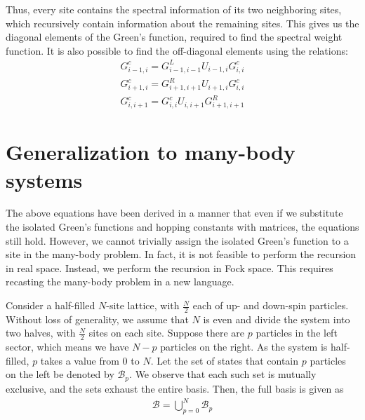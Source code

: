 	Thus, every site contains the spectral information of its two neighboring sites, which recursively contain information about the remaining sites. This gives us the diagonal elements of the Green's function, required to find the spectral weight function. It is also possible to find the off-diagonal elements using the relations:
	\begin{align}\label{eqn:connecting-eqn-onebody}
		G^{c}_{i-1,i} = G^{L}_{i-1,i-1} U_{i-1,i} G^{c}_{i,i}\\
		G^{c}_{i+1,i} = G^{R}_{i+1,i+1} U_{i+1,i} G^{c}_{i,i}\\
		G^{c}_{i,i+1} = G^{c}_{i,i} U_{i,i+1} G^{R}_{i+1,i+1}
	\end{align}

\section{Generalization to many-body systems}\label{sec:generalized-manybody}
	The above equations have been derived in a manner that even if we substitute the isolated Green's functions and hopping constants with matrices, the equations still hold.
	However, we cannot trivially assign the isolated Green's function to a site in the many-body problem. In fact, it is not feasible to perform the recursion in real space. Instead, we perform the recursion in Fock space. This requires recasting the many-body problem in a new language.
	
	Consider a half-filled $ N $-site lattice, with $ \tfrac{N}{2} $ each of up- and down-spin particles. Without loss of generality, we assume that $ N $ is even and divide the system into two halves, with $ \tfrac{N}{2} $ sites on each site. Suppose there are $ p $ particles in the left sector, which means we have $ N-p $ particles on the right. As the system is half-filled, $ p $ takes a value from $ 0 $ to $ N $. Let the set of states that contain $ p $ particles on the left be denoted by $ \mathcal{B}_{p} $. We observe that each such set is mutually exclusive, and the sets exhaust the entire basis. Then, the full basis is given as
	\begin{align}
		\mathcal{B} = \bigcup_{p = 0}^{N} \mathcal{B}_p
	\end{align}
	
